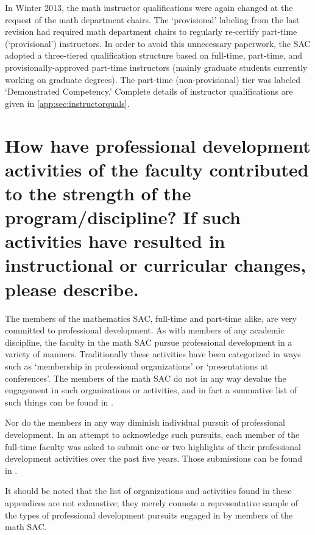 In Winter 2013, the math instructor qualifications were again changed at the 
request of the math department chairs.  The `provisional' labeling
from the last revision had required math department chairs to regularly
re-certify part-time (`provisional') instructors.  In order to avoid this
unnecessary paperwork, the SAC adopted a three-tiered qualification structure
based on full-time, part-time, and provisionally-approved part-time instructors
(mainly graduate students currently working on graduate degrees).  The
part-time (non-provisional) tier was labeled `Demonstrated Competency.'
Complete details of instructor qualifications are given in \vref{app:sec:instructorquals}.

\section{How have professional development activities of the faculty contributed to the strength of the program/discipline? If such activities have resulted in instructional or curricular changes, please describe.}

The members of the mathematics SAC, full-time and part-time alike, are very
committed to professional development.  As with members of any academic
discipline, the faculty in the math SAC pursue professional development in a
variety of manners.  Traditionally these activities have been categorized in
ways such as `membership in professional organizations' or `presentations at
conferences'.  The members of the math SAC do not in any way devalue the
engagement in such organizations or activities, and in fact a summative list of
such things can be found in
.

Nor do the members in any way diminish individual pursuit of professional
development.  In an attempt to acknowledge such pursuits, each member of the
full-time faculty was asked to submit one or two highlights of their
professional development activities over the past five years.  Those
submissions can be found in
.

It should be noted that the list of organizations and activities found in these
appendices are not exhaustive; they merely connote a representative sample of
the types of professional development pursuits engaged in by members of the
math SAC.

